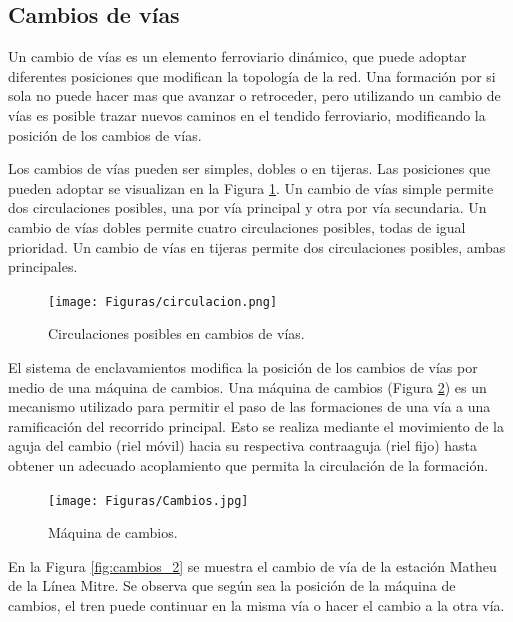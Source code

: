 \subsection{Cambios de vías}
    \label{sec:switches}
 	Un cambio de vías es un elemento ferroviario dinámico, que puede adoptar diferentes posiciones que modifican la topología de la red. Una formación por si sola no puede hacer mas que avanzar o retroceder, pero utilizando un cambio de vías es posible trazar nuevos caminos en el tendido ferroviario, modificando la posición de los cambios de vías.
 	
 	Los cambios de vías pueden ser simples, dobles o en tijeras. Las posiciones que pueden adoptar se visualizan en la Figura \ref{fig:cambios_0}. Un cambio de vías simple permite dos circulaciones posibles, una por vía principal y otra por vía secundaria. Un cambio de vías dobles permite cuatro circulaciones posibles, todas de igual prioridad. Un cambio de vías en tijeras permite dos circulaciones posibles, ambas principales.
 	
 	\begin{figure}[H]
 		\centering
 		\texttt{[image: Figuras/circulacion.png]}
 		\centering\caption{Circulaciones posibles en cambios de vías.}
 		\label{fig:cambios_0}
 	\end{figure}
 	
 	El sistema de enclavamientos modifica la posición de los cambios de vías por medio de una máquina de cambios. Una máquina de cambios (Figura \ref{fig:cambios_1}) es un mecanismo utilizado para permitir el paso de las formaciones de una vía a una ramificación del recorrido principal. Esto se realiza mediante el movimiento de la aguja del cambio (riel móvil) hacia su respectiva contraaguja (riel fijo) hasta obtener un adecuado acoplamiento que permita la circulación de la formación.

    \begin{figure}[H]
        \centering
        \texttt{[image: Figuras/Cambios.jpg]}
        \centering\caption{Máquina de cambios.}
        \label{fig:cambios_1}
    \end{figure}

    En la Figura \ref{fig:cambios_2} se muestra el cambio de vía de la estación Matheu de la Línea Mitre. Se observa que según sea la posición de la máquina de cambios, el tren puede continuar en la misma vía o hacer el cambio a la otra vía.

